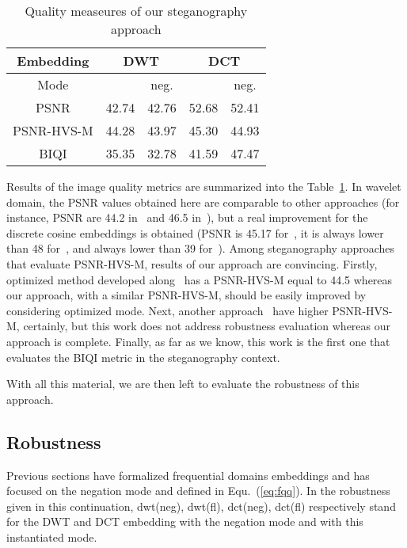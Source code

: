\documentclass{comjnl}
\begin{document}
\begin{table}
\begin{center}
\begin{tabular}{|c|c|c|c|c|}
\hline
Embedding & \multicolumn{2}{|c|}{DWT} 
 & \multicolumn{2}{|c|}{DCT} \\
\hline
Mode &  & neg. &  & neg. \\
\hline
PSNR & 42.74     & 42.76     &  52.68      &  52.41   \\
\hline
PSNR-HVS-M & 44.28  & 43.97 & 45.30 & 44.93 \\
\hline
BIQI & 35.35 & 32.78 & 41.59 & 47.47 \\
\hline
\end{tabular}
\end{center}
\caption{Quality measeures of our steganography approach\label{table:quality}} 
\end{table}



Results of the image quality metrics 
are summarized into the Table~\ref{table:quality}.
In wavelet domain, the PSNR values obtained here are comparable to other approaches
(for instance, PSNR are 44.2 in~\cite{TCL05} and 46.5 in~\cite{DA10}), 
but  a real improvement for the discrete cosine embeddings is obtained 
(PSNR is 45.17 for~\cite{CFS08}, it is always lower than 48 for~\cite{Mohanty:2008:IWB:1413862.1413865}, and always lower than 39 for~\cite{MK08}).
Among steganography approaches that evaluate PSNR-HVS-M, results of our approach 
are convincing. Firstly, optimized method developed along~\cite{Randall11} has a PSNR-HVS-M equal to 44.5 whereas our approach, with a similar PSNR-HVS-M, should be easily improved by considering optimized mode. Next, 
another approach~\cite{Muzzarelli:2010} have higher PSNR-HVS-M, certainly, but
this work does not address robustness evaluation whereas our approach is complete.
Finally, as far as we know, this work is the first one that evaluates the BIQI metric in the steganography context. 

 

With all this material, we are then left to evaluate the robustness of this 
approach. 







\subsection{Robustness}
Previous sections have formalized frequential domains embeddings and
has focused on the negation mode and  defined in Equ.~(\ref{eq:fqq}).
In the robustness given in this continuation, {dwt}(neg), 
{dwt}(fl), {dct}(neg), {dct}(fl) 
respectively stand for the DWT and DCT embedding 
with the negation mode and with this instantiated mode.
 
\end{document}
